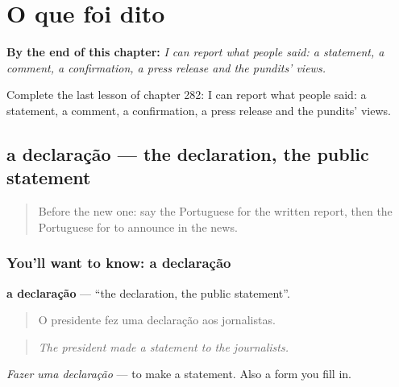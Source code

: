 
\chapter{O que foi dito}
\label{ch:pt-o-que-foi-dito}

\begin{chapteropening}
\textbf{By the end of this chapter:} \emph{I can report what people said: a statement, a comment, a confirmation, a press release and the pundits’ views.}

Complete the last lesson of chapter 282: I can report what people said: a statement, a comment, a confirmation, a press release and the pundits’ views.
\end{chapteropening}

\section[a declaração]{a declaração — the declaration, the public statement}

\label{lesson:PT-C282-declaracao}



\begin{quote}
Before the new one: say the Portuguese for the written report, then the Portuguese for to announce in the news.
\end{quote}

\subsection*{You'll want to know: a declaração}
\textbf{a declaração} — \textquotedblleft{}the declaration, the public statement\textquotedblright{}.

\begin{quote}
O presidente fez uma declaração aos jornalistas.
\end{quote}

\begin{quote}
\emph{The president made a statement to the journalists.}
\end{quote}

\emph{Fazer uma declaração} — to make a statement. Also a form you fill in.

